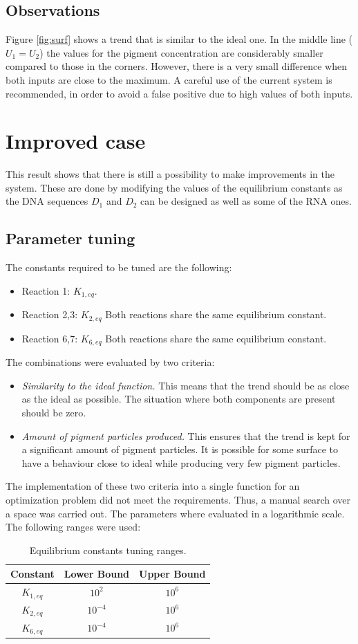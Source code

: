 \documentclass[10pt]{article}
\begin{document}
\subsection{Observations}
Figure \ref{fig:surf} shows a trend that is similar to the ideal one. In the middle line ($U_1=U_2$) the values for the pigment concentration are considerably smaller compared to those in the corners. However, there is a very small difference when both inputs are close to the maximum. A careful use of the current system is recommended, in order to avoid a false positive due to high values of both inputs.
\newpage

\section{Improved case}
This result shows that there is still a possibility to make improvements in the system. These are done by modifying the values of the equilibrium constants as the DNA sequences $D_1$ and $D_2$ can be designed as well as some of the RNA ones.  
\subsection{Parameter tuning}
The constants required to be tuned are the following: 
\begin{itemize}
\item Reaction 1: $K_{1,eq}$.
\item Reaction 2,3: $K_{2,eq}$ Both reactions share the same equilibrium constant.
\item Reaction 6,7: $K_{6,eq}$ Both reactions share the same equilibrium constant.
\end{itemize}
The combinations were evaluated by two criteria: 
\begin{itemize}
\item \textit{Similarity to the ideal function.} This means that the trend should be as close as the ideal as possible. The situation where both components are present should be zero. 
\item \textit{Amount of pigment particles produced.} This ensures that the trend is kept for a significant amount of pigment particles. It is possible for some surface to have a behaviour close to ideal while producing very few pigment particles. 
\end{itemize}
The implementation of these two criteria into a single function for an optimization problem did not meet the requirements. Thus, a manual search over a space was carried out. The parameters where evaluated in a logarithmic scale. The following ranges were used: 
\begin{table}[h]
\centering
\caption{Equilibrium constants tuning ranges.} \label{tb:ranges}
\begin{tabular}{c|c|c}
Constant & Lower Bound & Upper Bound  \\ \hline
$K_{1,eq}$ & $10^{2}$  & $10^{6}$ \\ 
$K_{2,eq}$ & $10^{-4}$ & $10^{6}$  \\
$K_{6,eq}$ & $10^{-4}$ & $10^{6}$
\end{tabular} 
\end{table}
\end{document}
